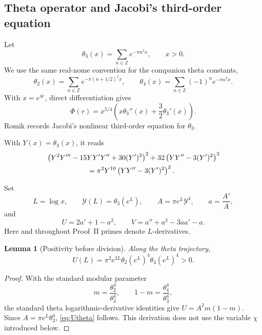 \documentclass{amsart}
\numberwithin{equation}{section}
\newtheorem{lemma}[theorem]{Lemma}
\theoremstyle{definition}
\theoremstyle{remark}
\begin{document}
\subsection{Theta operator and Jacobi's third-order equation}
Let
\begin{equation}\label{eq:theta3}
 \theta_3(x)=\sum_{n\in\mathbb Z}e^{-\pi n^2x},\qquad x>0.
\end{equation}
We use the same real-nome convention for the companion theta constants,
\begin{equation}\label{eq:theta24}
 \theta_2(x)=\sum_{n\in\mathbb Z}e^{-\pi(n+1/2)^2x},\qquad
 \theta_4(x)=\sum_{n\in\mathbb Z}(-1)^n e^{-\pi n^2x}.
\end{equation}
With $x=e^{4r}$, direct differentiation gives
\begin{equation}\label{eq:thetaop}
 \boxed{\quad
 \Phi(r)=x^{5/4}\left(x\theta_3''(x)+\frac32\theta_3'(x)\right).
 \quad}
\end{equation}
Romik \cite[Eq.~(28)]{Romik2020} records Jacobi's nonlinear third-order equation for $\theta_3$.\par With $Y(x)=\theta_3(x)$, it reads
\begin{equation}\label{eq:JacobiODE}
\begin{aligned}
&\left(Y^2Y'''-15YY'Y''+30(Y')^3\right)^2
 +32\left(YY''-3(Y')^2\right)^3\\
&\hspace{20mm}=\pi^2Y^{10}\left(YY''-3(Y')^2\right)^2.
\end{aligned}
\end{equation}

Set
\begin{equation}\label{eq:LAa}
 L=\log x,\qquad \mathscr Y(L)=\theta_3(e^L),\qquad
 A=\pi e^L\mathscr Y^4,\qquad a=\frac{A'}A,
\end{equation}
and
\begin{equation}\label{eq:UVdef}
 U=2a'+1-a^2,\qquad
 V=a''+a^3-3aa'-a.
\end{equation}
Here and throughout Proof~II primes denote $L$-derivatives.

\begin{lemma}[Positivity before division]\label{lem:Upos}
Along the theta trajectory,
\begin{equation}\label{eq:Utheta}
 \boxed{\qquad U(L)=\pi^2e^{2L}\theta_2(e^L)^4\theta_4(e^L)^4>0.\qquad}
\end{equation}
\end{lemma}
\begin{proof}
With the standard modular parameter
\[
 m=\frac{\theta_2^4}{\theta_3^4},\qquad1-m=\frac{\theta_4^4}{\theta_3^4},
\]
the standard theta logarithmic-derivative identities give
$U=A^2m(1-m)$.  Since $A=\pi e^L\theta_3^4$, \eqref{eq:Utheta} follows.  This derivation does not use the variable $\chi$ introduced below.
\end{proof}
\end{document}
